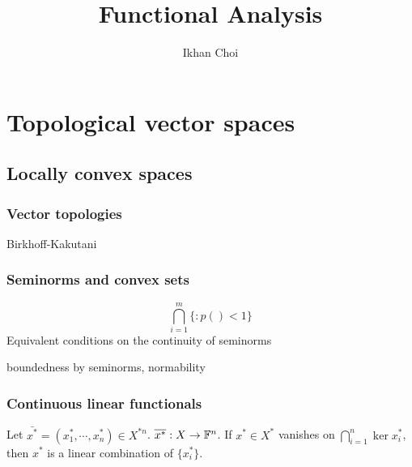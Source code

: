\documentclass{../../large}
\begin{document}
\title{Functional Analysis}
\author{Ikhan Choi}
\maketitle
\tableofcontents

\part{Topological vector spaces}


\chapter{Locally convex spaces}
\section{Vector topologies}

\begin{prb}
\end{prb}
\begin{prb}[Metrizability]
Birkhoff-Kakutani
\end{prb}
\begin{prb}
\end{prb}




\section{Seminorms and convex sets}
\begin{prb}[Seminorms]
\[\bigcap_{i=1}^m\{:p()<1\}\]
Equivalent conditions on the continuity of seminorms
\end{prb}
\begin{pf}
\end{pf}
boundedness by seminorms, normability

\section{Continuous linear functionals}
\begin{prb}
Let $\bar{x^*}=(x_1^*,\cdots,x_n^*)\in X^{*n}$.
$\overline{x^*}:X\to\mathbb{F}^n$.
If $x^*\in X^*$ vanishes on $\bigcap_{i=1}^n\ker x_i^*$, then $x^*$ is a linear combination of $\{x_i^*\}$.
\end{prb}
\end{document}
